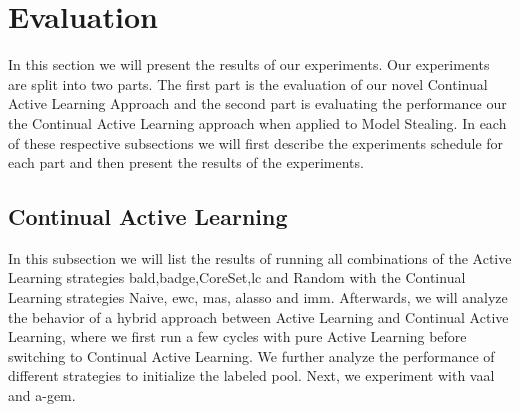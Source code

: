 
\chapter{Evaluation}
\label{ch:Evaluation}

In this section we will present the results of our experiments. Our experiments are split into two parts. The first part is the evaluation of our novel
Continual Active Learning Approach and the second part is evaluating the performance our the Continual Active Learning approach when applied to Model Stealing.
In each of these respective subsections we will first describe the experiments schedule for each part and then present the results of the experiments.



\section{Continual Active Learning}
\label{sec:CAL}
In this subsection we will list the results of running all combinations of the Active Learning strategies \gls{bald},\gls{badge},CoreSet,\gls{lc} and Random
with the Continual Learning strategies Naive, \gls{ewc}, \gls{mas}, \gls{alasso} and \gls{imm}. Afterwards, we will analyze the behavior of a hybrid approach between
Active Learning and Continual Active Learning, where we first run a few cycles with pure Active Learning before switching to Continual Active Learning. We further
analyze the performance of different strategies to initialize the labeled pool. Next, we experiment with \gls{vaal} and \gls{a-gem}.

